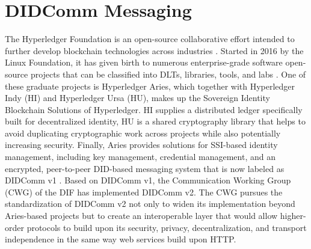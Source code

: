 \section{DIDComm Messaging}\label{section:didcomm}

The Hyperledger Foundation is an open-source collaborative effort intended to further develop blockchain technologies across industries \cite{jones_boswell_2022}. Started in 2016 by the Linux Foundation, it has given birth to numerous enterprise-grade software open-source projects that can be classified into DLTs, libraries, tools, and labs \cite{lusard_lehors_muscara_boswell_zsigri_2021}. One of these graduate projects is Hyperledger Aries, which together with Hyperledger Indy (HI) and Hyperledger Ursa (HU), makes up the Sovereign Identity Blockchain Solutions of Hyperledger. HI supplies a distributed ledger specifically built for decentralized identity, HU is a shared cryptography library that helps to avoid duplicating cryptographic work across projects while also potentially increasing security. Finally, Aries provides solutions for SSI-based identity management, including key management, credential management, and an encrypted, peer-to-peer DID-based messaging system that is now labeled as DIDComm v1 \cite{jones_boswell_2022}. 
Based on DIDComm v1, the Communication Working Group (CWG) of the DIF has implemented DIDComm v2. The CWG pursues the standardization of DIDComm v2 not only to widen its implementation beyond Aries-based projects but to create an interoperable layer that would allow higher-order protocols to build upon its security, privacy, decentralization, and transport independence in the same way web services build upon HTTP. \cite{young_2020} \cite{curren_looker_terbu_2020}


